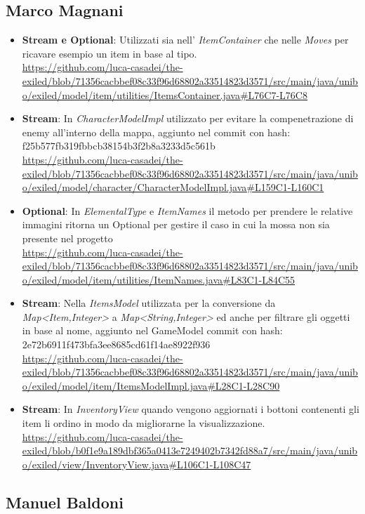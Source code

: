 \documentclass[a4paper,12pt]{report}
\begin{document}
\subsection{Marco Magnani}
\begin{itemize}
	\item \textbf{Stream e Optional}: Utilizzati sia nell' \textit{ItemContainer} che nelle \textit{Moves} per ricavare esempio un item in base al tipo.\\ \url{https://github.com/luca-casadei/the-exiled/blob/71356cacbbef08c33f96d68802a33514823d3571/src/main/java/unibo/exiled/model/item/utilities/ItemsContainer.java#L76C7-L76C8}
	\item \textbf{Stream}: In \textit{CharacterModelImpl} utilizzato per evitare la compenetrazione di enemy all'interno della mappa, aggiunto nel commit con hash: f25b577fb319fbbcb38154b3f2b8a3233d5c561b\\
	\url{https://github.com/luca-casadei/the-exiled/blob/71356cacbbef08c33f96d68802a33514823d3571/src/main/java/unibo/exiled/model/character/CharacterModelImpl.java#L159C1-L160C1} 
	\item \textbf{Optional}: In \textit{ElementalType} e \textit{ItemNames} il metodo per prendere le relative immagini ritorna un Optional per gestire il caso in cui la mossa non sia presente nel progetto\\
	\url{https://github.com/luca-casadei/the-exiled/blob/71356cacbbef08c33f96d68802a33514823d3571/src/main/java/unibo/exiled/model/item/utilities/ItemNames.java#L83C1-L84C55}
	\item \textbf{Stream}: Nella \textit{ItemsModel} utilizzata per la conversione da \textit{Map\textless Item,Integer\textgreater} a \textit{Map\textless String,Integer\textgreater} ed anche per filtrare gli oggetti in base al nome, aggiunto nel GameModel commit con hash: 2e72b6911f473bfa3ee8685cd61f14ae8922f936\\
	\url{https://github.com/luca-casadei/the-exiled/blob/71356cacbbef08c33f96d68802a33514823d3571/src/main/java/unibo/exiled/model/item/ItemsModelImpl.java#L28C1-L28C90}
	\item \textbf{Stream}: In \textit{InventoryView} quando vengono aggiornati i bottoni contenenti gli item li ordino in modo da migliorarne la visualizzazione.
	\url{https://github.com/luca-casadei/the-exiled/blob/b0f1e9a189dbf365a0413e7249402b7342fd88a7/src/main/java/unibo/exiled/view/InventoryView.java#L106C1-L108C47}
\end{itemize}


\subsection{Manuel Baldoni}
\end{document}
